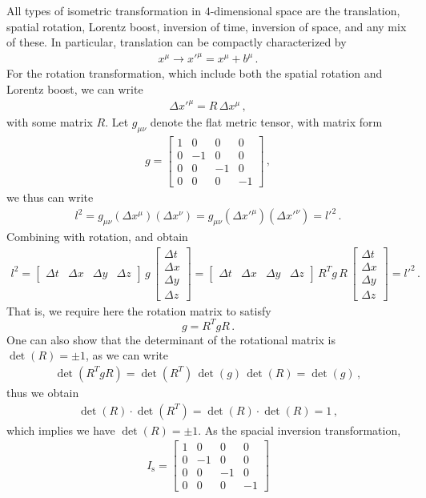 \documentclass[11pt, onesided]{book}
\theoremstyle{break}
\theoremstyle{break}
\newcommand{\bmat}[1]{\begin{bmatrix} #1 \end{bmatrix}}
\begin{document}
All types of isometric transformation in $4$-dimensional space are the translation, spatial rotation, Lorentz boost, inversion of time, inversion of space, and any mix of these. In particular, translation can be compactly characterized by
\begin{align*}
x^\mu \to x'^\mu = x^\mu + b^\mu\,. 
\end{align*}
For the rotation transformation, which include both the spatial rotation and Lorentz boost, we can write
\begin{align*}
\Delta x'^\mu = R \, \Delta x^\mu\,,
\end{align*}
with some matrix $R$. Let $g_{\mu\nu}$ denote the flat metric tensor, with matrix form
\begin{align*}
g = \bmat{1 & 0 & 0 & 0 \\
0 & -1 & 0 & 0\\
0 & 0 & -1 & 0\\
0 & 0 & 0 & -1}\,,
\end{align*}
we thus can write
\begin{align*}
l^2 = g_{\mu\nu}(\Delta x^\mu)(\Delta x^\nu) =g_{\mu\nu}(\Delta x'^\mu)(\Delta x'^\nu) = l'^2\,.
\end{align*}
Combining with rotation, and obtain
\begin{align*}
l^2 = 
\bmat{\Delta t & \Delta x & \Delta y & \Delta z}\, g \, \bmat{\Delta t\\
\Delta x\\
\Delta y \\
 \Delta z}
 =\bmat{\Delta t & \Delta x & \Delta y & \Delta z}\,R^T g \,R\, \bmat{\Delta t\\
\Delta x\\
\Delta y \\
 \Delta z} = l'^2\,.
\end{align*}
That is, we require here the rotation matrix to satisfy 
$$g = R^T g R\,.$$ 
One can also show that the determinant of the rotational matrix is $\det(R) = \pm 1$, as we can write
\begin{align*}
\det(R^T gR)=\det(R^T)\, \det(g)\, \det(R)   = \det(g) \,,
\end{align*}
thus we obtain
\begin{align*}
\det(R)\cdot \det(R^T) = \det(R) \cdot \det(R) = 1\,,
\end{align*}
which implies we have $\det(R) = \pm 1$. As the spacial inversion transformation, 
\begin{align*}
I_\text{s} = \bmat{1 & 0 & 0 & 0\\
0 & -1 & 0 & 0\\
0 & 0 & -1 & 0\\
0 & 0 & 0 & -1}
\end{align*}
\end{document}
